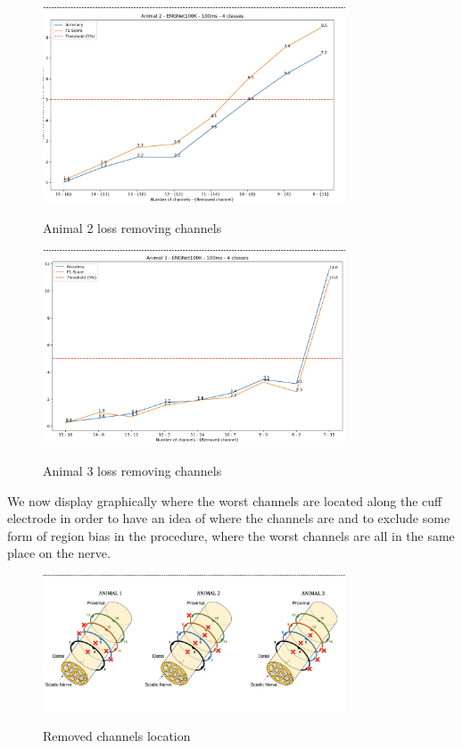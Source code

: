 \documentclass{Configuration_Files/PoliMi3i_thesis}
\begin{document}
\begin{figure}[H]
    \centering
    \includegraphics[width=0.8\textwidth]{Results Matteo/figure7}
    \label{figure7}
    \caption{Animal 2 loss removing channels}
\end{figure}

\begin{figure}[H]
    \centering
    \includegraphics[width=0.8\textwidth]{Results Matteo/figure8}
    \label{figure8}
    \caption{Animal 3 loss removing channels}
\end{figure}

We now display graphically where the worst channels are located along the cuff electrode in order to have an idea of where the channels are and to exclude some form of region bias in the procedure, where the worst channels are all in the same place on the nerve.

\begin{figure}[H]
    \centering
    \includegraphics[width=0.8\textwidth]{Results Matteo/figure9}
    \label{figure9}
    \caption{Removed channels location}
\end{figure}
\end{document}
